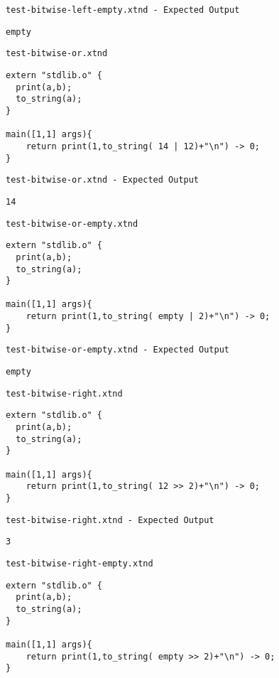 \medskip \noindent \texttt{test-bitwise-left-empty.xtnd - Expected Output}


\begin{lstlisting}
empty
\end{lstlisting}


\medskip \noindent \texttt{test-bitwise-or.xtnd}


\begin{lstlisting}
extern "stdlib.o" {
  print(a,b);
  to_string(a);
}

main([1,1] args){
	return print(1,to_string( 14 | 12)+"\n") -> 0;
}
\end{lstlisting}


\medskip \noindent \texttt{test-bitwise-or.xtnd - Expected Output}


\begin{lstlisting}
14
\end{lstlisting}


\medskip \noindent \texttt{test-bitwise-or-empty.xtnd}


\begin{lstlisting}
extern "stdlib.o" {
  print(a,b);
  to_string(a);
}

main([1,1] args){
	return print(1,to_string( empty | 2)+"\n") -> 0;
}
\end{lstlisting}


\medskip \noindent \texttt{test-bitwise-or-empty.xtnd - Expected Output}


\begin{lstlisting}
empty
\end{lstlisting}


\medskip \noindent \texttt{test-bitwise-right.xtnd}


\begin{lstlisting}
extern "stdlib.o" {
  print(a,b);
  to_string(a);
}

main([1,1] args){
	return print(1,to_string( 12 >> 2)+"\n") -> 0;
}
\end{lstlisting}


\medskip \noindent \texttt{test-bitwise-right.xtnd - Expected Output}


\begin{lstlisting}
3
\end{lstlisting}


\medskip \noindent \texttt{test-bitwise-right-empty.xtnd}


\begin{lstlisting}
extern "stdlib.o" {
  print(a,b);
  to_string(a);
}

main([1,1] args){
	return print(1,to_string( empty >> 2)+"\n") -> 0;
}
\end{lstlisting}


